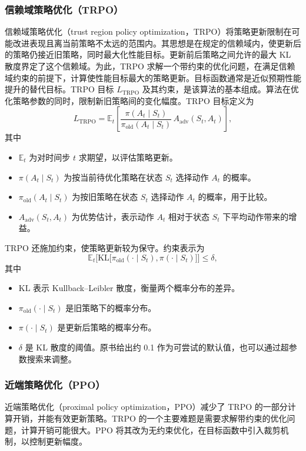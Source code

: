 \subsubsection{信赖域策略优化（TRPO）}
信赖域策略优化（trust region policy optimization，TRPO）将策略更新限制在可能改进表现且离当前策略不太远的范围内。其思想是在规定的信赖域内，使更新后的策略仍接近旧策略，同时最大化性能目标。更新前后策略之间允许的最大 KL 散度界定了这个信赖域。为此，TRPO 求解一个带约束的优化问题，在满足信赖域约束的前提下，计算使性能目标最大的策略更新。目标函数通常是近似预期性能提升的替代目标。TRPO 目标 $L_{\mathrm{TRPO}}$ 及其约束，是该算法的基本组成。算法在优化策略参数的同时，限制新旧策略间的变化幅度。TRPO 目标定义为
\begin{equation}
L_{\mathrm{TRPO}}=\mathbb{E}_t\left[
\frac{\pi(A_t\mid S_t)}{\pi_{\mathrm{old}}(A_t\mid S_t)}\,
A_{\mathrm{adv}}(S_t,A_t)\right],
\label{eq:appb-trpo}
\end{equation}
其中
\begin{itemize}
\item $\mathbb{E}_t$ 为对时间步 $t$ 求期望，以评估策略更新。
\item $\pi(A_t\mid S_t)$ 为按当前待优化策略在状态 $S_t$ 选择动作 $A_t$ 的概率。
\item $\pi_{\mathrm{old}}(A_t\mid S_t)$ 为按旧策略在状态 $S_t$ 选择动作 $A_t$ 的概率，用于比较。
\item $A_{\mathrm{adv}}(S_t,A_t)$ 为优势估计，表示动作 $A_t$ 相对于状态 $S_t$ 下平均动作带来的增益。
\end{itemize}
TRPO 还施加约束，使策略更新较为保守。约束表示为
\begin{equation}
\mathbb{E}_t\bigl[\mathrm{KL}\bigl[
\pi_{\mathrm{old}}(\cdot\mid S_t),\pi(\cdot\mid S_t)\bigr]\bigr]\leq\delta,
\label{eq:appb-trpo-constraint}
\end{equation}
其中
\begin{itemize}
\item $\mathrm{KL}$ 表示 Kullback–Leibler 散度，衡量两个概率分布的差异。
\item $\pi_{\mathrm{old}}(\cdot\mid S_t)$ 是旧策略下的概率分布。
\item $\pi(\cdot\mid S_t)$ 是更新后策略的概率分布。
\item $\delta$ 是 KL 散度的阈值。原书给出约 0.1 作为可尝试的默认值，也可以通过超参数搜索来调整。
\end{itemize}

\subsubsection{近端策略优化（PPO）}
\label{sec:appb-ppo}
近端策略优化（proximal policy optimization，PPO）减少了 TRPO 的一部分计算开销，并能有效更新策略。TRPO 的一个主要难题是需要求解带约束的优化问题，计算开销可能很大。PPO 将其改为无约束优化，在目标函数中引入裁剪机制，以控制更新幅度。

